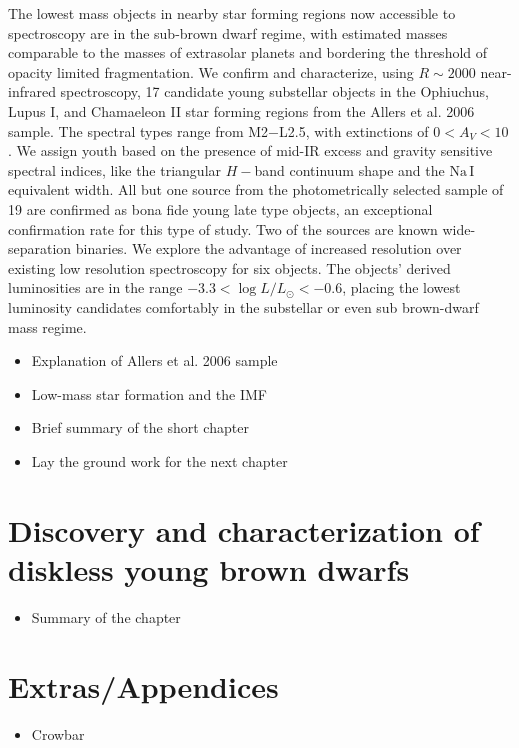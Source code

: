 The lowest mass objects in nearby star forming regions now accessible to spectroscopy are in the sub-brown dwarf regime, with estimated masses comparable to the masses of extrasolar planets and bordering the threshold of opacity limited fragmentation.  We confirm and characterize, using $R\sim 2000$ near-infrared spectroscopy, 17 candidate young substellar objects in the Ophiuchus, Lupus I, and Chamaeleon II star forming regions from the Allers et al. 2006 sample.  The spectral types range from M2$-$L2.5, with extinctions of $0 < A_V < 10$.  We assign youth based on the presence of mid-IR excess and gravity sensitive spectral indices, like the triangular $H-$band continuum shape and the $\mathrm{Na\, I}$ equivalent width.  All but one source from the photometrically selected sample of 19 are confirmed as bona fide young late type objects, an exceptional confirmation rate for this type of study.  Two of the sources are known wide-separation binaries.  We explore the advantage of increased resolution over existing low resolution spectroscopy for six objects.  The objects' derived luminosities are in the range $-3.3 < \log L/L_{\odot} < -0.6$, placing the lowest luminosity candidates comfortably in the substellar or even sub brown-dwarf mass regime.

\begin{itemize}
	\item Explanation of Allers et al. 2006 sample
	\item Low-mass star formation and the IMF
	\item Brief summary of the short chapter
	\item Lay the ground work for the next chapter
\end{itemize}

\section{Discovery and characterization of diskless young brown dwarfs}

\begin{itemize}
	\item Summary of the chapter
\end{itemize}


\section{Extras/Appendices}

\begin{itemize}
	\item Crowbar
\end{itemize}

